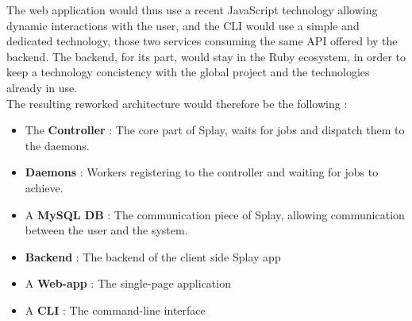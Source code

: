 \documentclass{eplmastersthesis}
\begin{document}
        The web application would thus use a recent JavaScript technology
        allowing dynamic interactions with the user, and the CLI would use
        a simple and dedicated technology, those two services consuming the
        same API offered by the backend. The backend, for its part, would
        stay in the Ruby ecosystem, in order to keep a technology concistency
        with the global project and the technologies already in use.\\

        The resulting reworked architecture would therefore be the following :

        \begin{itemize}
          \item The \textbf{Controller} : The core part of Splay, waits for jobs
          and dispatch them to the daemons.
          \item \textbf{Daemons} : Workers registering to the controller and waiting
          for jobs to achieve.
          \item A \textbf{MySQL DB} : The communication piece of Splay, allowing
          communication between the user and the system.
          \item \textbf{Backend} : The backend of the client side Splay app
          \item A \textbf{Web-app} : The single-page application
          \item A \textbf{CLI} : The command-line interface
        \end{itemize}
\end{document}
